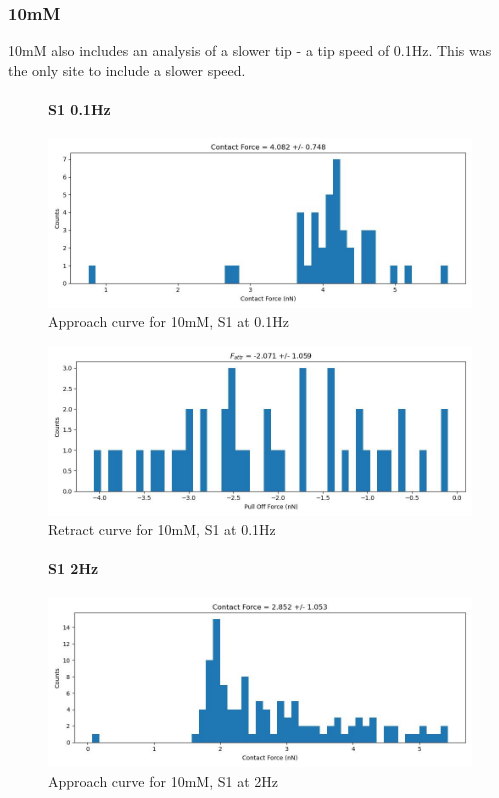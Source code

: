 \subsubsection*{10mM}
10mM also includes an analysis of a slower tip - a tip speed of 0.1Hz. This was the only site to include a slower speed. 
\begin{figure}[h!]
\paragraph{S1 0.1Hz}
\centering
\includegraphics[width=\textwidth]{chapter7/Tip speed/10mM/S1 0.1Hz/approach_f_c_hist.jpg}
\caption{Approach curve for 10mM, S1 at 0.1Hz}
\end{figure}

\begin{figure}[h!]
\centering
\includegraphics[width=\textwidth]{chapter7/Tip speed/10mM/S1 0.1Hz/retract_f_a_hist.jpg}
\caption{Retract curve for 10mM, S1 at 0.1Hz}
\end{figure}
\newpage

\begin{figure}[h!]
\paragraph{S1 2Hz}
\centering
\includegraphics[width=\textwidth]{chapter7/Tip speed/10mM/S1 2Hz/approach_f_c_hist.jpg}
\caption{Approach curve for 10mM, S1 at 2Hz}
\end{figure}

